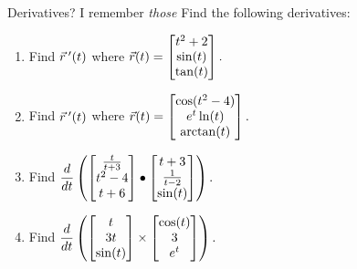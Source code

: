 \begin{exercise}{Derivatives? I remember \textit{those}}
Find the following derivatives:
\begin{enumerate}
\item Find $\vec{r}\hspace{0.2em}'(t)$ where $\vec{r}(t)=\begin{bmatrix}t^2+2\\ \sin(t)\\ \tan(t)\end{bmatrix}.$
\vspace{1em}
\item Find $\vec{r}\hspace{0.2em}'(t)$ where $\vec{r}(t)=\begin{bmatrix}\cos(t^2-4)\\ e^t\ln(t)\\ \arctan(t)\end{bmatrix}.$
\vspace{1em}
\item Find $\dfrac{d}{dt}\left(\begin{bmatrix}\frac{t}{t+3}\\ t^2-4\\t+6\end{bmatrix}\bullet\begin{bmatrix}t+3\\ \frac{1}{t-2}\\ \sin(t)\end{bmatrix}\right).$
\vspace{1em}
\item Find $\dfrac{d}{dt}\left(\begin{bmatrix}t\\3t\\ \sin(t)\end{bmatrix}\times\begin{bmatrix}\cos(t)\\3\\e^t\end{bmatrix}\right).$
\vspace{1em}
\end{enumerate}
\end{exercise}